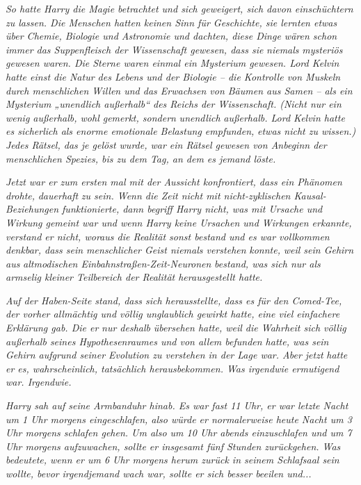 {\emph{So hatte Harry die Magie betrachtet und sich geweigert, sich davon einschüchtern zu lassen. Die Menschen hatten keinen Sinn für Geschichte, sie lernten etwas über Chemie, Biologie und Astronomie und dachten, diese Dinge wären schon immer das Suppenfleisch der Wissenschaft gewesen, dass sie} \emph{\emph{niemals}} \emph{mysteriös gewesen waren. Die Sterne waren einmal ein Mysterium gewesen. Lord Kelvin hatte einst die Natur des Lebens und der Biologie -- die Kontrolle von Muskeln durch menschlichen Willen und das Erwachsen von Bäumen aus Samen -- als ein Mysterium „unendlich außerhalb“ des Reichs der Wissenschaft. (Nicht nur ein wenig außerhalb, wohl gemerkt, sondern} \emph{\emph{unendlich}} \emph{außerhalb. Lord Kelvin hatte es sicherlich als enorme emotionale Belastung empfunden,} \emph{\emph{etwas nicht zu wissen.}) Jedes Rätsel, das je gelöst wurde, war ein Rätsel gewesen von Anbeginn der menschlichen Spezies, bis zu dem Tag, an dem es jemand löste.}

\emph{Jetzt war er zum ersten mal mit der Aussicht konfrontiert, dass ein Phänomen drohte,} \emph{\emph{dauerhaft}} \emph{zu sein. Wenn die Zeit nicht mit nicht-zyklischen Kausal-Beziehungen funktionierte, dann begriff Harry nicht, was mit Ursache und Wirkung gemeint war und wenn Harry keine Ursachen und Wirkungen erkannte, verstand er nicht, woraus die Realität sonst bestand und es war vollkommen denkbar, dass sein menschlicher Geist niemals verstehen} \emph{\emph{konnte,}} \emph{weil sein Gehirn aus} \emph{\emph{altmodischen Einbahnstraßen-Zeit-Neuronen}} \emph{bestand, was sich nur als armselig kleiner Teilbereich der Realität herausgestellt hatte.}

\emph{Auf der Haben-Seite stand, dass sich herausstellte, dass es für den Comed-Tee, der vorher allmächtig und völlig unglaublich gewirkt hatte, eine viel einfachere Erklärung gab. Die er} \emph{\emph{nur deshalb}} \emph{übersehen hatte, weil die Wahrheit sich völlig außerhalb seines Hypothesenraumes und von allem befunden hatte, was sein Gehirn aufgrund seiner Evolution zu verstehen in der Lage war. Aber jetzt} \emph{\emph{hatte}} \emph{er es, wahrscheinlich, tatsächlich herausbekommen. Was irgendwie ermutigend war. Irgendwie.}

\emph{Harry sah auf seine Armbanduhr hinab. Es war fast 11 Uhr, er war letzte Nacht um 1 Uhr morgens eingeschlafen, also würde er normalerweise heute Nacht um 3 Uhr morgens schlafen gehen. Um also um 10 Uhr abends einzuschlafen und um 7 Uhr morgens aufzuwachen, sollte er insgesamt fünf Stunden zurückgehen. Was bedeutete, wenn er um 6 Uhr morgens herum zurück in seinem Schlafsaal sein wollte, bevor} \emph{irgendjemand wach war, sollte er sich besser beeilen und...}

}
